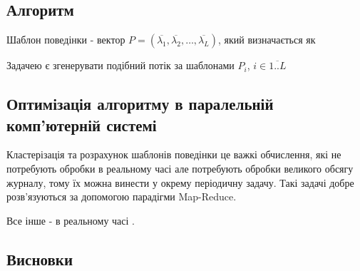 \newpage
{}
    \subsection{Алгоритм}

  Шаблон поведінки - вектор $P = (\overline{\lambda_1}, \overline{\lambda_2}, \dots, \overline{\lambda_L})$, який визначається як 

Задачею є згенерувати подібний потік за шаблонами $P_i$, $i \in \overline{1..L} $

	\subsection{Оптимізація алгоритму в паралельній комп'ютерній системі}
	Кластерізація та розрахунок шаблонів поведінки це важкі обчислення, які не потребують обробки в реальному часі але потребують обробки великого обсягу журналу, тому їх можна винести у окрему періодичну задачу. Такі задачі добре розв'язуються за допомогою парадігми Map-Reduce.

	Все інше - в реальному часі \TBD.


\newpage
\subsection*{Висновки}
    \TBD
